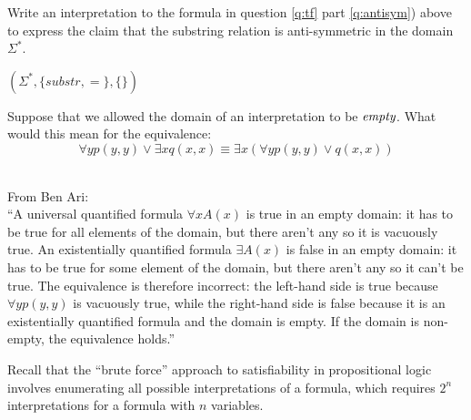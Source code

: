 \documentclass[]{exam}
\begin{document}
\begin{questions}

\question Write an interpretation to the formula in question \ref{q:tf} part \ref{q:antisym}) 
above to express the claim that the substring relation is
anti-symmetric in the domain $\Sigma^*$.
\begin{solution}
$(\Sigma^*, \{substr, = \}, \{\})$
\end{solution}

\clearpage
\question Suppose that we allowed the domain of an interpretation to be
$\emph{empty}$. What would this mean for the equivalence:
\[ \forall y p(y,y) \lor \exists x q(x,x) \equiv \exists x (\forall y p (y,y) \lor q(x,x))\]
\begin{solution}
~\\
From Ben Ari:\\
``A universal quantified formula $\forall xA(x)$ is true in an empty domain: it has to be true 
for all elements of the domain, but there aren’t any so it is vacuously true. An existentially 
quantified formula $\exists A(x)$ is false in an empty domain: it has to be true for some 
element of the domain, but there aren’t any so it can’t be true. The equivalence is therefore 
incorrect: the left-hand side is true because $\forall yp(y,y)$ is vacuously true, while the 
right-hand side is false because it is an existentially quantified formula and the domain is 
empty. If the domain is non-empty, the equivalence holds.''
\end{solution}

\question Recall that the ``brute force'' approach to satisfiability in
propositional logic involves enumerating all possible interpretations of a
formula, which requires $2^n$ interpretations for a formula with $n$ variables.
\end{questions}
\end{document}
